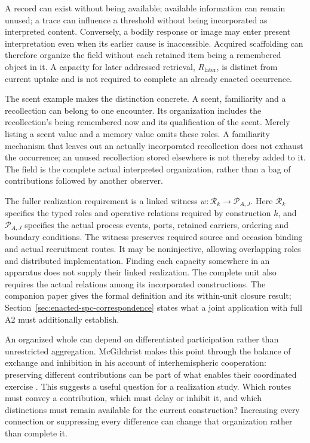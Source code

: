 A record can exist without being available; available information can remain unused; a trace can influence a threshold without being incorporated as interpreted content. Conversely, a bodily response or image may enter present interpretation even when its earlier cause is inaccessible. Acquired scaffolding can therefore organize the field without each retained item being a remembered object in it. A capacity for later addressed retrieval, $R_{\mathrm{later}}$, is distinct from current uptake and is not required to complete an already enacted occurrence.

The scent example makes the distinction concrete. A scent, familiarity and a recollection can belong to one encounter. Its organization includes the recollection's being remembered now and its qualification of the scent. Merely listing a scent value and a memory value omits these roles. A familiarity mechanism that leaves out an actually incorporated recollection does not exhaust the occurrence; an unused recollection stored elsewhere is not thereby added to it. The field is the complete actual interpreted organization, rather than a bag of contributions followed by another observer.

The fuller realization requirement is a linked witness $w:\mathcal R_k\to\mathcal P_{A,J}$. Here $\mathcal R_k$ specifies the typed roles and operative relations required by construction $k$, and $\mathcal P_{A,J}$ specifies the actual process events, ports, retained carriers, ordering and boundary conditions. The witness preserves required source and occasion binding and actual recruitment routes. It may be noninjective, allowing overlapping roles and distributed implementation. Finding each capacity somewhere in an apparatus does not supply their linked realization. The complete unit also requires the actual relations among its incorporated constructions. The companion paper gives the formal definition and its within-unit closure result; Section~\ref{sec:enacted-spc-correspondence} states what a joint application with full A2 must additionally establish.


An organized whole can depend on differentiated participation rather than unrestricted aggregation. McGilchrist makes this point through the balance of exchange and inhibition in his account of interhemispheric cooperation: preserving different contributions can be part of what enables their coordinated exercise \cite[ch.~6, pp.~210--213]{McGilchristMaster2019}. This suggests a useful question for a realization study. Which routes must convey a contribution, which must delay or inhibit it, and which distinctions must remain available for the current construction? Increasing every connection or suppressing every difference can change that organization rather than complete it.


